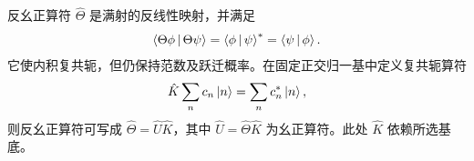 反幺正算符 $\hat\Theta$ 是满射的反线性映射，并满足
\begin{equation}
\Braket{\Theta\phi|\Theta\psi}
=\Braket{\phi|\psi}^*=\Braket{\psi|\phi}.
\end{equation}
它使内积复共轭，但仍保持范数及跃迁概率。在固定正交归一基中定义复共轭算符
\begin{equation}
\hat K\sum_n c_n\Ket{n}=\sum_n c_n^*\Ket{n},
\end{equation}
则反幺正算符可写成 $\hat\Theta=\hat U\hat K$，其中 $\hat U=\hat\Theta\hat K$ 为幺正算符。此处 $\hat K$ 依赖所选基底。
